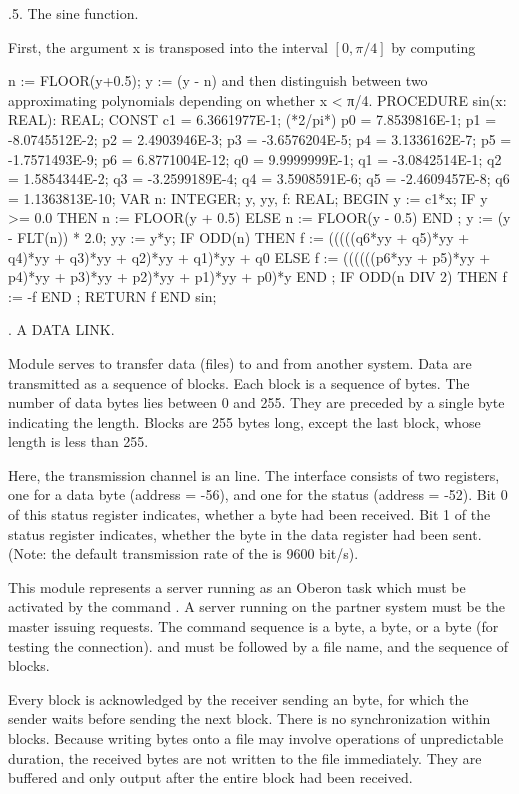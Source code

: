 .5. The sine function.


First, the argument x is transposed into the interval $[0, \pi/4]$ by computing

n := FLOOR(y+0.5); y := (y - n)
and then distinguish between two approximating polynomials depending on whether x < π/4.
PROCEDURE sin(x: REAL): REAL; CONST c1 = 6.3661977E-1; (*2/pi*)
p0 = 7.8539816E-1; p1 = -8.0745512E-2; p2 = 2.4903946E-3; p3 = -3.6576204E-5; p4 = 3.1336162E-7; p5 = -1.7571493E-9; p6 = 6.8771004E-12; q0 = 9.9999999E-1; q1 = -3.0842514E-1; q2 = 1.5854344E-2; q3 = -3.2599189E-4; q4 = 3.5908591E-6; q5 = -2.4609457E-8; q6 = 1.1363813E-10;
VAR n: INTEGER; y, yy, f: REAL; BEGIN y := c1*x;
IF y >= 0.0 THEN n := FLOOR(y + 0.5) ELSE n := FLOOR(y - 0.5) END ;
y := (y - FLT(n)) * 2.0; yy := y*y;
IF ODD(n) THEN f := (((((q6*yy + q5)*yy + q4)*yy + q3)*yy + q2)*yy + q1)*yy + q0 ELSE f := ((((((p6*yy + p5)*yy + p4)*yy + p3)*yy + p2)*yy + p1)*yy + p0)*y
END ;
IF ODD(n DIV 2) THEN f := -f END ;
RETURN f
END sin;

. A DATA LINK.

Module  serves to transfer data (files) to and from another system. Data are transmitted as a sequence of blocks. Each block is a sequence of bytes. The number of data bytes lies between 0 and 255. They are preceded by a single byte indicating the length. Blocks are 255 bytes long, except the last block, whose length is less than 255.

Here, the transmission channel is an  line. The interface consists of two registers, one for a data byte (address = -56), and one for the status (address = -52). Bit 0 of this status register indicates, whether a byte had been received. Bit 1 of the status register indicates, whether the byte in the data register had been sent. (Note: the default transmission rate of the \RISC is 9600 bit/s).

This module represents a server running as an Oberon task which must be activated by the command . A server running on the partner system must be the master issuing requests. The command sequence is a  byte, a  byte, or a  byte (for testing the connection).  and  must be followed by a file name, and the sequence of blocks.

Every block is acknowledged by the receiver sending an  byte, for which the sender waits before sending the next block. There is no synchronization within blocks. Because writing bytes onto a file may involve operations of unpredictable duration, the received bytes are not written to the file immediately. They are buffered and only output after the entire block had been received.
\begintt

